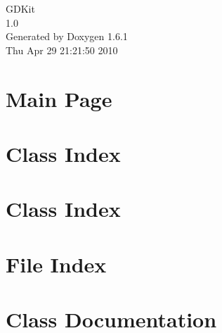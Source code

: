 \documentclass[a4paper]{book}
\begin{document}
\hypersetup{pageanchor=false}
\begin{titlepage}
\vspace*{7cm}
\begin{center}
{\Large GDKit \\[1ex]\large 1.0 }\\
\vspace*{1cm}
{\large Generated by Doxygen 1.6.1}\\
\vspace*{0.5cm}
{\small Thu Apr 29 21:21:50 2010}\\
\end{center}
\end{titlepage}
\clearemptydoublepage
{}
\tableofcontents
\clearemptydoublepage
{}
\hypersetup{pageanchor=true}
\chapter{Main Page}
\label{index}\hypertarget{index}{}
\chapter{Class Index}

\chapter{Class Index}

\chapter{File Index}

\chapter{Class Documentation}


































\end{document}
